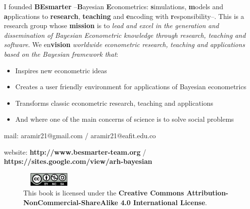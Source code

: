 I founded \textbf{BEsmarter} --\textbf{B}ayesian \textbf{E}conometrics: \textbf{s}imulations, \textbf{m}odels and \textbf{a}pplications to \textbf{research}, \textbf{teaching} and \textbf{e}ncoding with \textbf{r}esponsibility--. This is a research group whose \textbf{mission} is to \textit{lead and excel in the generation and dissemination of Bayesian Econometric knowledge through research, teaching and software}. We en\textbf{vision} \textit{worldwide econometric research, teaching and applications based on the Bayesian framework that}:

\begin{itemize}
	\item Inspires new econometric ideas
	\item Creates a user friendly environment for applications of Bayesian econometrics
	\item Transforms classic econometric research, teaching and applications
	\item And where one of the main concerns of science is to solve social problems    
\end{itemize}

mail: aramir21@gmail.com / aramir21@eafit.edu.co

website: \textbf{http://www.besmarter-team.org} / \textbf{https://sites.google.com/view/arh-bayesian}

\begin{figure}[h]
	\includegraphics[width=80pt, height=20pt]{frontmatter/figures/by-nc-sa.png}
	\caption[List of figure caption goes here]{This book is licensed under the \textbf{Creative Commons Attribution-NonCommercial-ShareAlike 4.0 International License}.}\label{fig02}
\end{figure}




